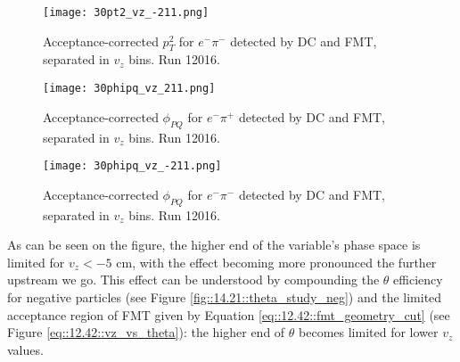     \begin{figure}
        \centering
        \texttt{[image: 30pt2\_vz\_-211.png]}
        \caption[Acceptance-corrected $p_T^2$ for $e^-\pi^-$ separated in $v_z$ bins, run 12016]
        {Acceptance-corrected $p_T^2$ for $e^-\pi^-$ detected by DC and FMT, separated in $v_z$ bins.
        Run 12016.}
        \label{fig::14.30::pt2_-211_vz}
    \end{figure}

    \begin{figure}
        \centering
        \texttt{[image: 30phipq\_vz\_211.png]}
        \caption[Acceptance-corrected $\phi_{PQ}$ for $e^-\pi^+$ separated in $v_z$ bins, run 12016]
        {Acceptance-corrected $\phi_{PQ}$ for $e^-\pi^+$ detected by DC and FMT, separated in $v_z$ bins.
        Run 12016.}
        \label{fig::14.30::phipq_211_vz}
    \end{figure}

    \begin{figure}
        \centering
        \texttt{[image: 30phipq\_vz\_-211.png]}
        \caption[Acceptance-corrected $\phi_{PQ}$ for $e^-\pi^-$ separated in $v_z$ bins, run 12016]
        {Acceptance-corrected $\phi_{PQ}$ for $e^-\pi^-$ detected by DC and FMT, separated in $v_z$ bins.
        Run 12016.}
        \label{fig::14.30::phipq_-211_vz}
    \end{figure}




    As can be seen on the figure, the higher end of the variable's phase space is limited for $v_z < -5$ cm, with the effect becoming more pronounced the further upstream we go.
    This effect can be understood by compounding the $\theta$ efficiency for negative particles (see Figure \ref{fig::14.21::theta_study_neg}) and the limited acceptance region of FMT given by Equation \eqref{eq::12.42::fmt_geometry_cut} (see Figure \ref{eq::12.42::vz_vs_theta}): the higher end of $\theta$ becomes limited for lower $v_z$ values.

